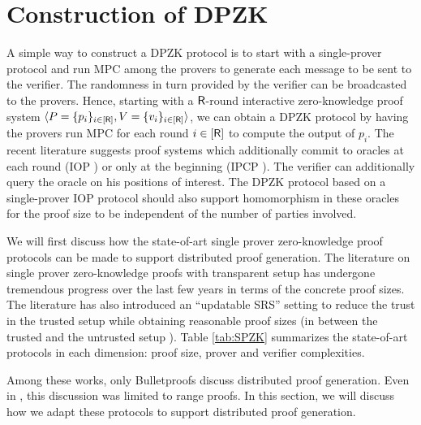 \section{Construction of DPZK}
A simple way to construct a DPZK protocol is to start with a single-prover protocol and run MPC among the provers to generate each message to be sent to the verifier. The randomness in turn provided by the verifier can be broadcasted to the provers.
Hence, starting with a $\mathsf{R}$-round interactive zero-knowledge proof system $\langle P = \{p_i\}_{i\in[\mathsf{R}]},V = \{v_i\}_{i \in [\mathsf{R}]}\rangle$, we can obtain a DPZK protocol by having the provers run MPC for each round $i \in [\mathsf{R}]$ to compute the output of $p_i$. The recent literature suggests proof systems which additionally commit to oracles at each round (IOP \cite{aurora}) or only at the beginning (IPCP \cite{ligero}). The verifier can additionally query the oracle on his positions of interest. The DPZK protocol based on a single-prover IOP protocol should also support homomorphism in these oracles for the proof size to be independent of the number of parties involved.





We will first discuss how the state-of-art single prover zero-knowledge proof protocols can be made to support distributed proof generation.
The literature on single prover zero-knowledge proofs with transparent setup has undergone tremendous progress over the last few years in terms of the concrete proof sizes. The literature has also introduced an ``updatable SRS'' setting \cite{sonic, libra, supersonic} to reduce the trust in the trusted setup while obtaining reasonable proof sizes (in between the trusted \cite{pinnochio_PHGR} and the untrusted setup \cite{aurora, bulletproofs}). Table \ref{tab:SPZK} summarizes the state-of-art protocols in each dimension: proof size, prover and verifier complexities.

Among these works, only Bulletproofs \cite{bulletproofs} discuss distributed proof generation. Even in \cite{bulletproofs}, this discussion was limited to range proofs. In this section, we will discuss how we adapt these protocols to support distributed proof generation. %

